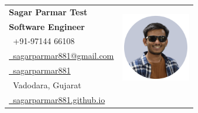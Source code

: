 \documentclass[a4paper,11pt]{article}
\makeatletter
\newcommand{\name}{Sagar Parmar Test} %
\newcommand{\role}{Software Engineer} %
\newcommand{\phone}{97144 66108} %
\newcommand{\emaila}{sagarparmar881@gmail.com} %
\newcommand{\home}{Vadodara, Gujarat} %
\newcommand{\website}{sagarparmar881.github.io} %
\makeatother
\begin{document}
\selectfont

{ \renewcommand{\arraystretch}{1.15}





\begin{tabularx}{\linewidth}{L r} \textbf{\LARGE \name}
\vspace{2mm} 
&  \\ %

\textbf{\normalsize \role} & \\
{\raisebox{0.0\height}{\footnotesize \faPhone}\ +91-\phone} & \\ %

\href{mailto:\emaila}{\raisebox{0.0\height}{\footnotesize
\faEnvelope}\ {\emaila}} & \\ %


\href{https://github.com/sagarparmar881}{\raisebox{0.0\height}{\footnotesize
\faGithub}\ {sagarparmar881}} & \\ %

{\raisebox{0.0\height}{\footnotesize \faHome}\ \home} & \\ %

\href{https://sagarparmar881.github.io/}{\raisebox{0.0\height}{\footnotesize
\faGlobe}\ \website} & \\ \end{tabularx}  %

}


\end{document}
